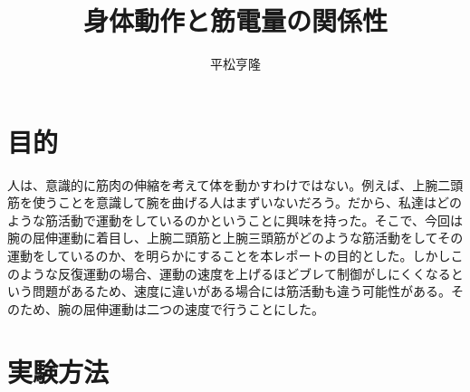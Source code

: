 \documentclass{jsarticle}
\begin{document}
\title{身体動作と筋電量の関係性}
\author{平松亨隆}
\maketitle


\section{目的}
人は、意識的に筋肉の伸縮を考えて体を動かすわけではない。例えば、上腕二頭筋を使うことを意識して腕を曲げる人はまずいないだろう。だから、私達はどのような筋活動で運動をしているのかということに興味を持った。そこで、今回は腕の屈伸運動に着目し、上腕二頭筋と上腕三頭筋がどのような筋活動をしてその運動をしているのか、を明らかにすることを本レポートの目的とした。しかしこのような反復運動の場合、運動の速度を上げるほどブレて制御がしにくくなるという問題があるため、速度に違いがある場合には筋活動も違う可能性がある。そのため、腕の屈伸運動は二つの速度で行うことにした。

\section{実験方法}
\end{document}

